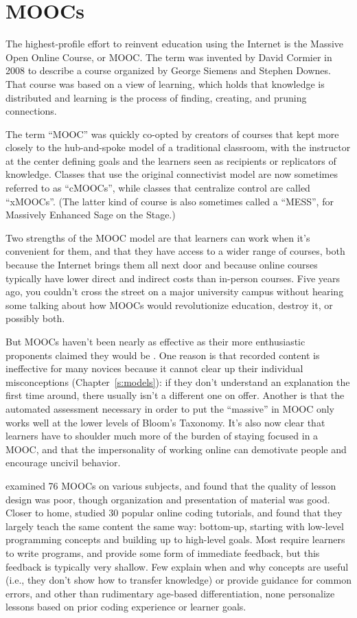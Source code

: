 \section{MOOCs}\label{s:online-moocs}

The highest-profile effort to reinvent education using the Internet is
the Massive Open Online Course, or MOOC. The term was invented by
David Cormier in 2008 to describe a course organized by George Siemens
and Stephen Downes. That course was based on a
 view of learning, which holds that
knowledge is distributed and learning is the process of finding,
creating, and pruning connections.

The term ``MOOC'' was quickly co-opted by creators of courses that kept
more closely to the hub-and-spoke model of a traditional classroom, with
the instructor at the center defining goals and the learners seen as
recipients or replicators of knowledge. Classes that use the original
connectivist model are now sometimes referred to as ``cMOOCs'', while
classes that centralize control are called ``xMOOCs''. (The latter kind of
course is also sometimes called a ``MESS'', for Massively Enhanced Sage on
the Stage.)

Two strengths of the MOOC model are that learners can work when it's
convenient for them, and that they have access to a wider range of
courses, both because the Internet brings them all next door and because
online courses typically have lower direct and indirect costs than
in-person courses. Five years ago, you couldn't cross the street on a
major university campus without hearing some talking about how MOOCs
would revolutionize education, destroy it, or possibly both.

But MOOCs haven't been nearly as effective as their more enthusiastic
proponents claimed they would be \cite{Ubel2017}. One reason is that
recorded content is ineffective for many novices because it cannot clear
up their individual misconceptions (Chapter~\ref{s:models}): if they
don't understand an explanation the first time around, there usually
isn't a different one on offer. Another is that the automated assessment
necessary in order to put the ``massive'' in MOOC only works well at the
lower levels of Bloom's Taxonomy. It's also now clear that learners have
to shoulder much more of the burden of staying focused in a MOOC, and
that the impersonality of working online can demotivate people and
encourage uncivil behavior.

\cite{Marg2015} examined 76 MOOCs on various subjects, and found that
the quality of lesson design was poor, though organization and
presentation of material was good. Closer to home, \cite{Kim2017}
studied 30 popular online coding tutorials, and found that they largely
teach the same content the same way: bottom-up, starting with low-level
programming concepts and building up to high-level goals. Most require
learners to write programs, and provide some form of immediate feedback,
but this feedback is typically very shallow. Few explain when and why
concepts are useful (i.e., they don't show how to transfer knowledge) or
provide guidance for common errors, and other than rudimentary age-based
differentiation, none personalize lessons based on prior coding
experience or learner goals.

